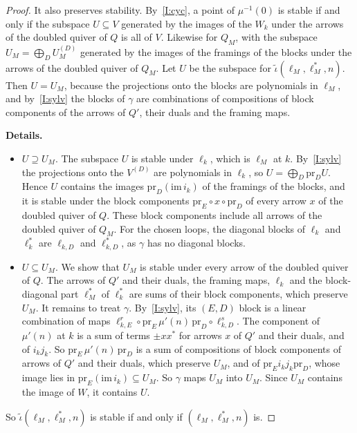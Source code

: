 \documentclass[11pt]{amsart}
\newenvironment{details}{\par\color{black!60!green}\noindent\textbf{Details.}\ }{\par}
\begin{document}
\begin{proof}
It also preserves stability.  By~\ref{I:cyc}, a point of $\mu^{-1}(0)$ is
stable if and only if the subspace $U\subseteq V$ generated by the images of
the $W_k$ under the arrows of the doubled quiver of $Q$ is all of $V$.
Likewise for $Q_M$, with the subspace $U_M=\bigoplus_DU_M^{(D)}$ generated by
the images of the framings of the blocks under the arrows of the doubled
quiver of $Q_M$.  Let $U$ be the subspace for
$\tilde\iota(\ell_M,\ell_M^*,n)$.  Then $U=U_M$, because the projections onto
the blocks are polynomials in $\ell_M$, and by~\ref{I:sylv} the blocks of
$\gamma$ are combinations of compositions of block components of the arrows
of $Q'$, their duals and the framing maps.
\begin{details}
\begin{itemize}[leftmargin=2em]
\item $U\supseteq U_M$.  The subspace $U$ is stable under $\ell_k$, which is
$\ell_M$ at $k$.  By~\ref{I:sylv} the projections onto the $V^{(D)}$ are
polynomials in $\ell_k$, so $U=\bigoplus_D\mathrm{pr}_DU$.  Hence $U$ contains
the images $\mathrm{pr}_D(\mathrm{im}\,i_k)$ of the framings of the blocks,
and it is stable under the block components $\mathrm{pr}_E\circ
x\circ\mathrm{pr}_D$ of every arrow $x$ of the doubled quiver of $Q$.  These
block components include all arrows of the doubled quiver of $Q_M$.  For
the chosen loops, the diagonal blocks of $\ell_k$ and $\ell_k^*$ are
$\ell_{k,D}$ and $\ell^*_{k,D}$, as $\gamma$ has no diagonal blocks.
\item $U\subseteq U_M$.  We show that $U_M$ is stable under every arrow of
the doubled quiver of $Q$.  The arrows of $Q'$ and their duals, the framing
maps, $\ell_k$ and the block-diagonal part $\ell_M^*$ of $\ell_k^*$ are sums
of their block components, which preserve $U_M$.  It remains to treat $\gamma$.
By~\ref{I:sylv}, its $(E,D)$ block is a linear combination of maps
$\ell_{k,E}^r\circ\mathrm{pr}_E\,\mu'(n)\,\mathrm{pr}_D\circ\ell_{k,D}^s$.
The component of $\mu'(n)$ at $k$ is a sum of terms $\pm xx^*$ for arrows $x$
of $Q'$ and their duals, and of $i_kj_k$.  So
$\mathrm{pr}_E\,\mu'(n)\,\mathrm{pr}_D$ is a sum of compositions of block
components of arrows of $Q'$ and their duals, which preserve $U_M$, and of
$\mathrm{pr}_Ei_kj_k\mathrm{pr}_D$, whose image lies in
$\mathrm{pr}_E(\mathrm{im}\,i_k)\subseteq U_M$.  So $\gamma$ maps $U_M$ into
$U_M$.  Since $U_M$ contains the image of $W$, it contains $U$.
\end{itemize}
\end{details}
So $\tilde\iota(\ell_M,\ell_M^*,n)$ is stable if and only if
$(\ell_M,\ell_M^*,n)$ is.


\end{proof}
\end{document}
